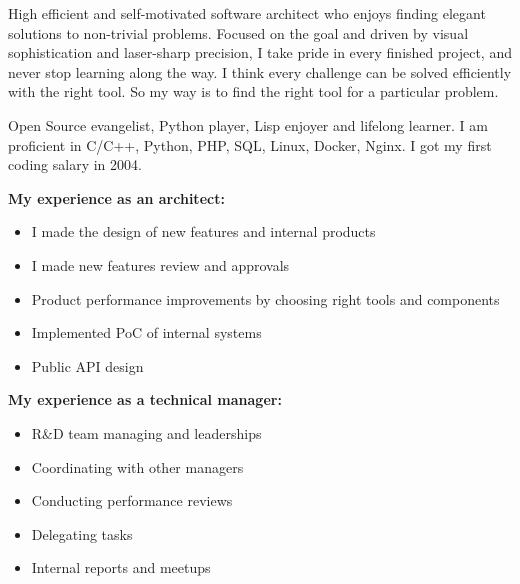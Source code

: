 
\begin{cvparagraph}

High efficient and self-motivated software architect who enjoys finding elegant
solutions to non-trivial problems. Focused on the goal and driven by visual
sophistication and laser-sharp precision, I take pride in every finished
project, and never stop learning along the way. I think every challenge can be
solved efficiently with the right tool. So my way is to find the right tool for
a particular problem.

Open Source evangelist, Python player, Lisp enjoyer and lifelong learner.
I am proficient in C/C++, Python, PHP, SQL, Linux, Docker, Nginx. I got my
first coding salary in 2004.

\textbf{My experience as an architect:}

\begin{itemize}
    \item I made the design of new features and internal products
    \item I made new features review and approvals
    \item Product performance improvements by choosing right tools and components
    \item Implemented PoC of internal systems
    \item Public API design
\end{itemize}

\textbf{My experience as a technical manager:}

\begin{itemize}
    \item R\&D team managing and leaderships
    \item Coordinating with other managers
    \item Conducting performance reviews
    \item Delegating tasks
    \item Internal reports and meetups
\end{itemize}

\end{cvparagraph}
